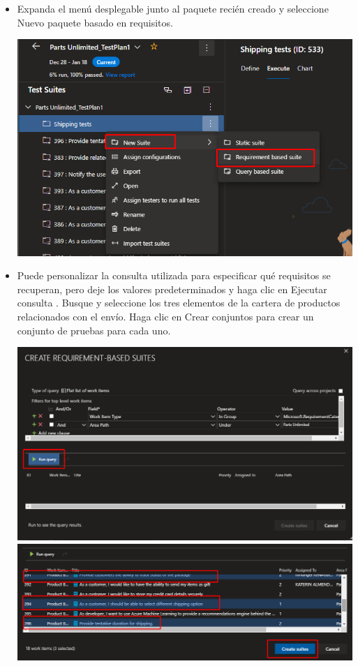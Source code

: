 \begin{itemize}
\item Expanda el menú desplegable junto al paquete recién creado y seleccione Nuevo paquete basado en requisitos.
\begin{center}
\includegraphics[width=\columnwidth]{images/18}\newline
\end{center}

\item Puede personalizar la consulta utilizada para especificar qué requisitos se recuperan, pero deje los valores predeterminados y haga clic en Ejecutar consulta . Busque y seleccione los tres elementos de la cartera de productos relacionados con el envío. Haga clic en Crear conjuntos para crear un conjunto de pruebas para cada uno.
\begin{center}
\includegraphics[width=\columnwidth]{images/19}\newline
\includegraphics[width=\columnwidth]{images/20}\newline
\end{center}


\end{itemize}
